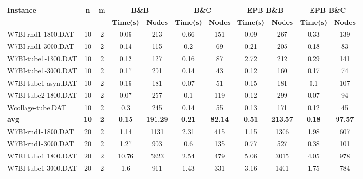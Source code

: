 \begin{table}[!ht]
\centering
\hspace*{-1cm}\begin{tabular}{lcccccccccc}
\toprule
\textbf{Instance} & \textbf{n} & \textbf{m} & \multicolumn{2}{c}{\textbf{B\&B}} & \multicolumn{2}{c}{\textbf{B\&C}}  & \multicolumn{2}{c}{\textbf{EPB B\&B}} & \multicolumn{2}{c}{\textbf{EPB B\&C}} \\

\cmidrule(r){4-5} \cmidrule(r){6-7} \cmidrule(r){8-9} \cmidrule(r){10-11} 
~ & ~ & ~ & \textbf{Time(s)} &\textbf{Nodes} & \textbf{Time(s)} &\textbf{Nodes} & \textbf{Time(s)} &\textbf{Nodes} & \textbf{Time(s)} &\textbf{Nodes}  \\
\midrule

W7BI-rnd1-1800.DAT & 10 & 2 &  \textcolor{blue2}{0.06} & 213 & 0.66 & 151 & 0.09 & 267 & 0.33 & 139 \\
W7BI-rnd1-3000.DAT & 10 & 2 &  \textcolor{blue2}{0.14} & 115 & 0.2 & 69 & 0.21 & 205 & 0.18 & 83 \\
W7BI-tube1-1800.DAT & 10 & 2 &  \textcolor{blue2}{0.12} & 127 & 0.16 & 87 & 2.72 & 212 & 0.29 & 141 \\
W7BI-tube1-3000.DAT & 10 & 2 & 0.17 & 201 & 0.14 & 43 &  \textcolor{blue2}{0.12} & 160 & 0.17 & 74 \\
W7BI-tube1-asyn.DAT & 10 & 2 & 0.16 & 181 &  \textcolor{blue2}{0.07} & 51 & 0.15 & 181 & 0.1 & 107 \\
W7BI-tube2-1800.DAT & 10 & 2 &  \textcolor{blue2}{0.07} & 257 & 0.1 & 119 & 0.12 & 299 &  \textcolor{blue2}{0.07} & 94 \\
Wcollage-tube.DAT & 10 & 2 & 0.3 & 245 & 0.14 & 55 & 0.13 & 171 &  \textcolor{blue2}{0.12} & 45 \\
\cline{1-11} \textbf{avg} & \textbf{10} & \textbf{2} & \textbf{0.15} & \textbf{191.29} & \textbf{0.21} & \textbf{82.14} & \textbf{0.51} & \textbf{213.57} & \textbf{0.18} & \textbf{97.57} \\ \cline{1-11}
W7BI-rnd1-1800.DAT & 20 & 2 &  \textcolor{blue2}{1.14} & 1131 & 2.31 & 415 & 1.15 & 1306 & 1.98 & 607 \\
W7BI-rnd1-3000.DAT & 20 & 2 & 1.27 & 903 & 0.6 & 135 & 0.77 & 527 &  \textcolor{blue2}{0.38} & 101 \\
W7BI-tube1-1800.DAT & 20 & 2 & 10.76 & 5823 &  \textcolor{blue2}{2.54} & 479 & 5.06 & 3015 & 4.05 & 978 \\
W7BI-tube1-3000.DAT & 20 & 2 & 1.6 & 911 &  \textcolor{blue2}{1.43} & 331 & 3.16 & 1401 & 1.75 & 784 \\

\end{tabular}
\end{table}
